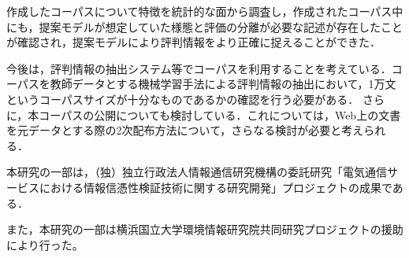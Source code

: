 \documentclass[japanese]{jnlp_1.4}
\begin{document}
作成したコーパスについて特徴を統計的な面から調査し，作成されたコーパス中にも，提案モデルが想定していた様態と評価の分離が必要な記述が存在したことが確認され，提案モデルにより評判情報をより正確に捉えることができた．

今後は，評判情報の抽出システム等でコーパスを利用することを考えている．コーパスを教師データとする機械学習手法による評判情報の抽出において，1万文というコーパスサイズが十分なものであるかの確認を行う必要がある．
さらに，本コーパスの公開についても検討している．これについては，Web上の文書を元データとする際の2次配布方法について，さらなる検討が必要と考えられる．
\vspace{-0.5\baselineskip}



\acknowledgment
\vspace{-0.5\baselineskip}

本研究の一部は，（独）独立行政法人情報通信研究機構の委託研究「電気通信サービスにおける情報信憑性検証技術に関する研究開発」プロジェクトの成果である．

また，本研究の一部は横浜国立大学環境情報研究院共同研究プロジェクトの援助により行った。


\vspace{-0.5\baselineskip}
\end{document}
